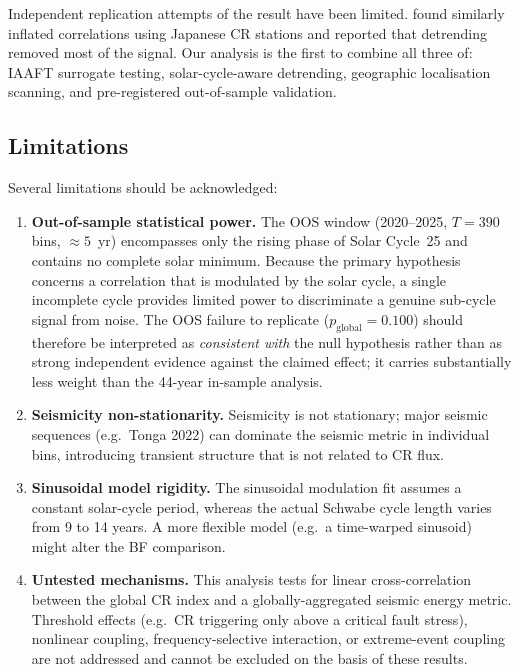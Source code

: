 \documentclass[12pt,a4paper]{article}
\begin{document}
Independent replication attempts of the \citet{Homola2023} result have been
limited.
\citet{Urata2018} found similarly inflated correlations using Japanese CR stations
and reported that detrending removed most of the signal.
Our analysis is the first to combine all three of: IAAFT surrogate testing,
solar-cycle-aware detrending, geographic localisation scanning, and pre-registered
out-of-sample validation.

\subsection{Limitations}

Several limitations should be acknowledged:
\begin{enumerate}
  \item \textbf{Out-of-sample statistical power.}
    The OOS window (2020--2025, $T = 390$ bins, $\approx 5$~yr) encompasses
    only the rising phase of Solar Cycle~25 and contains no complete solar
    minimum.
    Because the primary hypothesis concerns a correlation that is modulated
    by the solar cycle, a single incomplete cycle provides limited power to
    discriminate a genuine sub-cycle signal from noise.
    The OOS failure to replicate ($p_\text{global} = 0.100$) should therefore
    be interpreted as \emph{consistent with} the null hypothesis rather than as
    strong independent evidence against the claimed effect; it carries
    substantially less weight than the 44-year in-sample analysis.

  \item \textbf{Seismicity non-stationarity.}
    Seismicity is not stationary; major seismic sequences (e.g.\ Tonga 2022)
    can dominate the seismic metric in individual bins, introducing transient
    structure that is not related to CR flux.

  \item \textbf{Sinusoidal model rigidity.}
    The sinusoidal modulation fit assumes a constant solar-cycle period,
    whereas the actual Schwabe cycle length varies from 9 to 14 years.
    A more flexible model (e.g.\ a time-warped sinusoid) might alter the BF
    comparison.

  \item \textbf{Untested mechanisms.}
    This analysis tests for linear cross-correlation between the global CR
    index and a globally-aggregated seismic energy metric.
    Threshold effects (e.g.\ CR triggering only above a critical fault stress),
    nonlinear coupling, frequency-selective interaction, or extreme-event
    coupling are not addressed and cannot be excluded on the basis of these
    results.
\end{enumerate}
\end{document}
